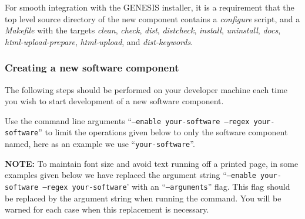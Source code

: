 \documentclass[12pt]{article}
\begin{document}
For smooth integration with the GENESIS installer, it is a requirement that the top level source directory of the new component contains a {\it configure} script, and a {\it Makefile} with the targets {\it clean}, {\it check}, {\it dist}, {\it distcheck}, {\it install}, {\it uninstall}, {\it docs}, {\it html-upload-prepare}, {\it html-upload}, and {\it dist-keywords}.

\subsubsection*{Creating a new software component}

The following steps should be performed on your developer machine each time you wish to start development of a new software component.

Use the command line arguments ``{\tt --enable your-software --regex your-software}'' to limit the operations given below to only the software component named, here as an example we use ``{\tt your-software}''. 

{\bf NOTE:} To maintain font size and avoid text running off a printed page, in some examples given below we have replaced the argument string ``{\tt --enable your-software --regex your-software}' with an ``{\tt --arguments}'' flag. This flag should be replaced by the argument string when running the command. You will be warned for each case when this replacement is necessary. 
\end{document}
